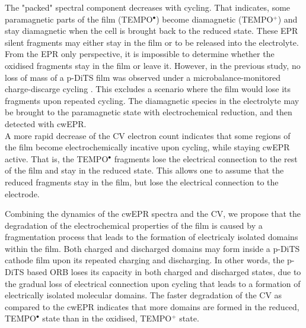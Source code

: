 \documentclass{WileyMSP-template}
\newcommand{\ik}[1]{\textcolor{RawSienna}{#1}}
\begin{document}
\ik{
The "packed" spectral component decreases with cycling. That indicates, some paramagnetic parts of the film (TEMPO$^{\bullet}$) become diamagnetic (TEMPO$^{+}$) and stay diamagnetic when the cell is brought back to the reduced state. These EPR silent fragments may either stay in the film or to be released into the electrolyte. 
From the EPR only perspective, it is impossible to determine whether the oxidised fragments stay in the film or leave it. However, in the previous study, no loss of mass of a p-DiTS film was observed under a microbalance-monitored charge-discarge cycling \cite{vereshchagin2020_battandsupercaps}. This excludes a scenario where the film would lose its fragments upon repeated cycling. The diamagnetic species in the electrolyte may be brought to the paramagnetic state with electrochemical reduction, and then detected with cwEPR.\\
}
\ik{
A more rapid decrease of the CV electron count indicates that some regions of the film become electrochemically incative upon cycling, while staying cwEPR active. That is, the  TEMPO$^{\bullet}$ fragments lose the electrical connection to the rest of the film and stay in the reduced state. This allows one to assume that the reduced fragments stay in the film, but lose the electrical connection to the electrode.\\
}

\ik{
Combining the dynamics of the cwEPR spectra and the CV, we propose that the degradation of the electrochemical properties of the film is caused by a fragmentation process that leads to the formation of electricaly isolated domains within the film. Both charged and discharged domains may form inside a p-DiTS cathode film upon its repeated charging and discharging. In other words, the p-DiTS based ORB loses its capacity in both charged and discharged states, due to the gradual loss of electrical connection upon cycling that leads to a formation of electrically isolated molecular domains. The faster degradation of the CV as compared to the cwEPR indicates that more domains are formed in the reduced, TEMPO$^{\bullet}$ state than in the oxidised, TEMPO$^{+}$ state.\\
}

\bigbreak
\end{document}
